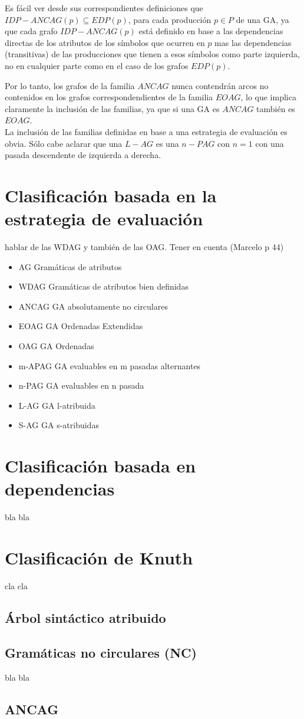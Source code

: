 Es fácil ver desde sus correspondientes definiciones que $IDP-{ANCAG}(p) \subseteq EDP(p)$, 
para cada producción $p \in P$ de una GA, ya que cada grafo $IDP-{ANCAG}(p)$ está definido 
en base a las dependencias directas de los atributos de los símbolos que ocurren en $p$ mas las 
dependencias (transitivas) de las producciones que tienen a esos símbolos como 
parte izquierda, no en cualquier parte como en el caso de los grafos $EDP(p)$.

Por lo tanto, los grafos de la familia $ANCAG$ nunca contendrán arcos no
contenidos en los grafos correspondendientes de la familia $EOAG$, lo que 
implica claramente la inclusión de las familias, ya que si una GA es $ANCAG$ 
también es $EOAG$. \\

La inclusión de las familias definidas en base a una estrategia de evaluación es
obvia. Sólo cabe aclarar que una $L-AG$ es una $n-PAG$ con $n=1$ con una pasada
descendente de izquierda a derecha.


\section{Clasificación basada en la estrategia de evaluación}

hablar de las WDAG y también de las OAG. Tener en cuenta (Marcelo p 44)

\begin{itemize}
\item AG      Gramáticas de atributos
\item WDAG    Gramáticas de atributos bien definidas   
\item ANCAG   GA absolutamente no circulares
\item EOAG    GA Ordenadas Extendidas
\item OAG     GA Ordenadas       
\item m-APAG  GA evaluables en m pasadas alternantes       
\item n-PAG   GA evaluables en n pasada       
\item L-AG    GA l-atribuida        
\item S-AG    GA s-atribuidas
\end{itemize}

\section{Clasificación basada en dependencias}

bla bla

\section{Clasificación de Knuth}

cla cla

\subsection{Árbol sintáctico atribuido}


\subsection{Gramáticas no circulares (NC)}

bla bla

\subsection{ANCAG}
